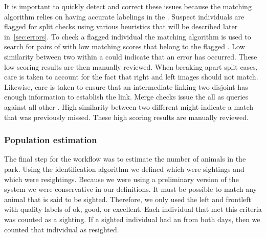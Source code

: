             It is important to quickly detect and correct these issues
              because the matching algorithm relies on having accurate
              labelings in the \masterdatabase{}.
            Suspect individuals are flagged for split checks using
              various heuristics that will be described later
              in~\cref{sec:errors}.
            To check a flagged individual the matching algorithm is
              used to search for pairs of \annots{} with low matching
              scores that belong to the flagged \name{}.
            Low similarity between two \annots{} within a \name{}
              could indicate that an error has occurred.
            These low scoring results are then manually reviewed.
            When breaking apart split cases, care is taken to account
              for the fact that right and left images should not match.
            Likewise, care is taken to ensure that an intermediate
              \annot{} linking two disjoint \annots{} has enough
              information to establish the link.
            Merge checks issue the all \exemplars{} as queries against
              all other \exemplars{}.
            High similarity between two different \names{} might
              indicate a match that was previously missed.
            These high scoring results are manually reviewed.

        \subsubsection{Population estimation}
            The final step for the \GZC{} workflow was to estimate the
              number of animals in the park.
            Using the identification algorithm we defined which
              \annots{} were sightings and which were resightings.
            Because we were using a preliminary version of the system
              we were conservative in our definitions.
            It must be possible to match any animal that is said to be
              sighted.
            Therefore, we only used the left and frontleft \annots{}
              with quality labels of ok, good, or excellent.
            Each individual that met this criteria was counted as a
              sighting.
            If a sighted individual had an \annot{} from both days,
              then we counted that individual as resighted.

